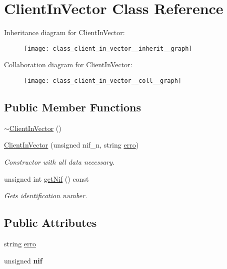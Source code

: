 \hypertarget{class_client_in_vector}{}\section{Client\+In\+Vector Class Reference}
\label{class_client_in_vector}


Inheritance diagram for Client\+In\+Vector\+:\nopagebreak
\begin{figure}[H]
\begin{center}
\leavevmode
\texttt{[image: class\_client\_in\_vector\_\_inherit\_\_graph]}
\end{center}
\end{figure}


Collaboration diagram for Client\+In\+Vector\+:\nopagebreak
\begin{figure}[H]
\begin{center}
\leavevmode
\texttt{[image: class\_client\_in\_vector\_\_coll\_\_graph]}
\end{center}
\end{figure}
\subsection*{Public Member Functions}
\begin{DoxyCompactItemize}
\item 
\hyperlink{class_client_in_vector_aa5187e63a59d3340d1287d7a91b4106a}{$\sim$\+Client\+In\+Vector} ()
\item 
\hyperlink{class_client_in_vector_a10ec0356f39e99be9205d5c0f6897652}{Client\+In\+Vector} (unsigned nif\+\_\+n, string \hyperlink{class_client_in_vector_a65d04995fa02a6f36d00540120be34b5}{erro})
\begin{DoxyCompactList}\small\item\em Constructor with all data necessary. \end{DoxyCompactList}\item 
unsigned int \hyperlink{class_client_in_vector_adab501aba615f5d9b69bbe7a28053801}{get\+Nif} () const
\begin{DoxyCompactList}\small\item\em Gets identification number. \end{DoxyCompactList}\end{DoxyCompactItemize}
\subsection*{Public Attributes}
\begin{DoxyCompactItemize}
\item 
string \hyperlink{class_client_in_vector_a65d04995fa02a6f36d00540120be34b5}{erro}
\item 
\mbox{\label{class_client_in_vector_a8a7af8db098724eb214125a67c733955}} 
unsigned {\bfseries nif}
\end{DoxyCompactItemize}
